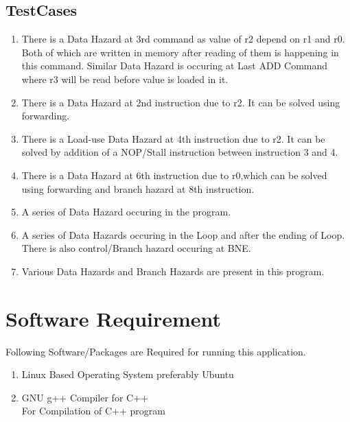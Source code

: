\documentclass[12pt]{extarticle}
\begin{document}
\subsection{TestCases}
\begin{enumerate}
\item 
There is a Data Hazard at 3rd command as value of r2 depend on r1 and r0.
Both of which are written in memory after reading of them is happening in this command.
Similar Data Hazard is occuring at Last ADD Command where r3 will be read before value is loaded in it.
\item 
There is a Data Hazard at 2nd instruction due to r2. It can be solved using forwarding.
\item 
There is a Load-use Data Hazard at 4th instruction due to r2. It can be solved by addition of a NOP/Stall instruction between instruction 3 and 4.
\item 
There is a Data Hazard at 6th instruction due to r0,which can be solved using forwarding and branch hazard at 8th instruction.
\item 
A series of Data Hazard occuring in the program.
\item 
A series of Data Hazards occuring in the Loop and after the ending of Loop. There is also control/Branch hazard occuring at BNE.
\item 
Various Data Hazards and Branch Hazards are present in this program.
\end{enumerate}

\section{Software Requirement}
Following Software/Packages are Required for running this application.
\begin{enumerate}
\item Linux Based Operating System preferably Ubuntu
\item GNU g++ Compiler for C++\\
For Compilation of C++ program
\end{enumerate}
\end{document}
